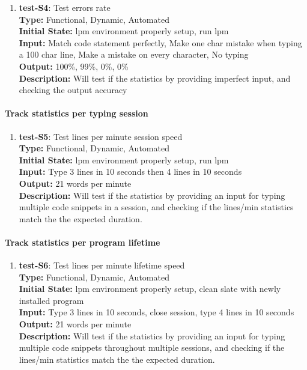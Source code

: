 \documentclass[12pt, titlepage]{article}
\begin{document}
\begin{enumerate}
\item{\textbf{test-S4}: Test errors rate\\}
\textbf{Type:} Functional, Dynamic, Automated \\
\textbf{Initial State:} lpm environment properly setup, run lpm\\
\textbf{Input:} Match code statement perfectly, Make one char mistake when typing a 100 char line, Make a mistake on every character, No typing\\
\textbf{Output:} 100\%, 99\%, 0\%, 0\% \\
\textbf{Description:} Will test if the statistics by providing imperfect input, and checking the output accuracy

\end{enumerate}

\paragraph{Track statistics per typing session}
\begin{enumerate}

\item{\textbf{test-S5}: Test lines per minute session speed\\}
\textbf{Type:} Functional, Dynamic, Automated\\
\textbf{Initial State:} lpm environment properly setup, run lpm\\
\textbf{Input:} Type 3 lines in 10 seconds then 4 lines in 10 seconds \\
\textbf{Output:} 21 words per minute \\
\textbf{Description:} Will test if the statistics by providing an input for typing multiple code snippets in a session, and checking if the lines/min statistics match the the expected duration.\\
\end{enumerate}

\paragraph{Track statistics per program lifetime}
\begin{enumerate}
\item{\textbf{test-S6}: Test lines per minute lifetime speed\\}
\textbf{Type:} Functional, Dynamic, Automated\\
\textbf{Initial State:} lpm environment properly setup, clean slate with newly installed program \\
\textbf{Input:} Type 3 lines in 10 seconds, close session, type 4 lines in 10 seconds \\
\textbf{Output:} 21 words per minute \\
\textbf{Description:} Will test if the statistics by providing an input for typing multiple code snippets throughout multiple sessions, and checking if the lines/min statistics match the the expected duration.\\
\end{enumerate}
\end{document}
